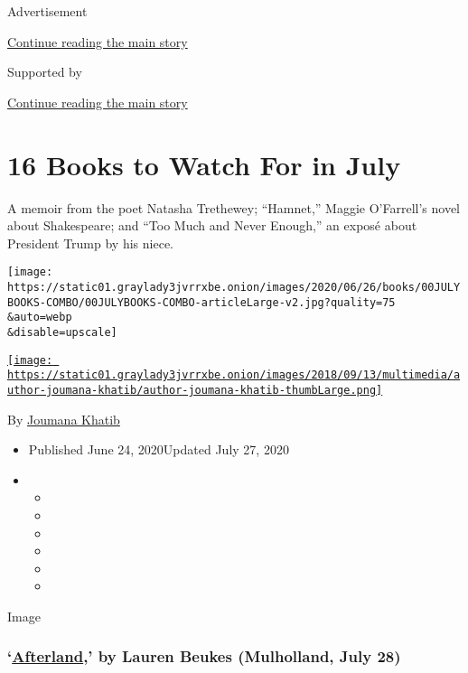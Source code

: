 Advertisement

\protect\hyperlink{after-top}{Continue reading the main story}

Supported by

\protect\hyperlink{after-sponsor}{Continue reading the main story}

\hypertarget{16-books-to-watch-for-in-july}{%
\section{16 Books to Watch For in
July}\label{16-books-to-watch-for-in-july}}

A memoir from the poet Natasha Trethewey; ``Hamnet,'' Maggie O'Farrell's
novel about Shakespeare; and ``Too Much and Never Enough,'' an exposé
about President Trump by his niece.

\texttt{[image: https://static01.graylady3jvrrxbe.onion/images/2020/06/26/books/00JULYBOOKS-COMBO/00JULYBOOKS-COMBO-articleLarge-v2.jpg?quality=75\\\&auto=webp\\\&disable=upscale]}

\href{https://nytimes3xbfgragh.onion/by/joumana-khatib}{\texttt{[image: https://static01.graylady3jvrrxbe.onion/images/2018/09/13/multimedia/author-joumana-khatib/author-joumana-khatib-thumbLarge.png]}}

By \href{https://nytimes3xbfgragh.onion/by/joumana-khatib}{Joumana
Khatib}

\begin{itemize}
\item
  Published June 24, 2020Updated July 27, 2020
\item
  \begin{itemize}
  \item
  \item
  \item
  \item
  \item
  \item
  \end{itemize}
\end{itemize}

Image

\hypertarget{afterland-by-lauren-beukes-mulholland-july-28}{%
\subsubsection{\texorpdfstring{`\href{https://www.mulhollandbooks.com/titles/lauren-beukes/afterland/9780316267847/}{Afterland},'
by Lauren Beukes (Mulholland, July
28)}{`Afterland,' by Lauren Beukes (Mulholland, July 28)}}\label{afterland-by-lauren-beukes-mulholland-july-28}}

